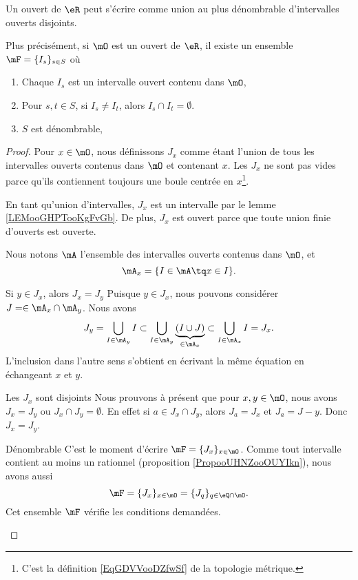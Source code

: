 \begin{proposition}     
	Un ouvert de \( \eR\) peut s'écrire comme union au plus dénombrable d'intervalles ouverts disjoints.

	Plus précisément, si \( \mO\) est un ouvert de \( \eR\), il existe un ensemble \( \mF=\{ I_s \}_{s\in S}\) où
	\begin{enumerate}
		\item
		      Chaque \( I_s\) est un intervalle ouvert contenu dans \( \mO\),
		\item
		      Pour \( s,t\in S\), si \( I_s\neq I_t\), alors \( I_s\cap I_t=\emptyset\).
		\item
		      \( S\) est dénombrable,
	\end{enumerate}
\end{proposition}

\begin{proof}
	Pour \( x\in \mO\), nous définissons \( J_x\) comme étant l'union de tous les intervalles ouverts contenus dans \( \mO\) et contenant \( x\). Les \( J_x\) ne sont pas vides parce qu'ils contiennent toujours une boule centrée en \( x\)\footnote{C'est la définition \ref{EqGDVVooDZfwSf} de la topologie métrique.}.

	En tant qu'union d'intervalles, \( J_x\) est un intervalle par le lemme \ref{LEMooGHPTooKgFvGb}. De plus, \( J_x\) est ouvert parce que toute union finie d'ouverts est ouverte.

	Nous notons \( \mA\) l'ensemble des intervalles ouverts contenus dans \( \mO\), et
	\begin{equation}
		\mA_x=\{ I\in\mA\tq x\in I \}.
	\end{equation}

	\begin{subproof}
		\item[Si \( y\in J_x\), alors \( J_x=J_y\)]
		Puisque \( y\in J_x\), nous pouvons considérer \( J=\in \mA_x\cap \mA_y\). Nous avons
		\begin{equation}
			J_y=\bigcup_{I\in\mA_y}I\subset \bigcup_{I\in \mA_y}\underbrace{(I\cup J)}_{\in\mA_x}\subset \bigcup_{I\in\mA_x}I=J_x.
		\end{equation}
		L'inclusion dans l'autre sens s'obtient en écrivant la même équation en échangeant \( x\) et \( y\).
		\item[Les \( J_x\) sont disjoints]
		Nous prouvons à présent que pour \( x,y\in \mO\), nous avons \( J_x=J_y \) ou \( J_x\cap J_y=\emptyset\). En effet si \( a\in J_x\cap J_y\), alors \( J_a=J_x\) et \( J_a=J-y\). Donc \( J_x=J_y\).
		\item[Dénombrable]
		C'est le moment d'écrire \( \mF=\{ J_x \}_{x\in \mO}\). Comme tout intervalle contient au moins un rationnel (proposition \ref{PropooUHNZooOUYIkn}), nous avons aussi
		\begin{equation}
			\mF=\{ J_x \}_{x\in \mO}=\{ J_q \}_{q\in \eQ\cap\mO}.
		\end{equation}
		Cet ensemble \( \mF\) vérifie les conditions demandées.
	\end{subproof}
\end{proof}

